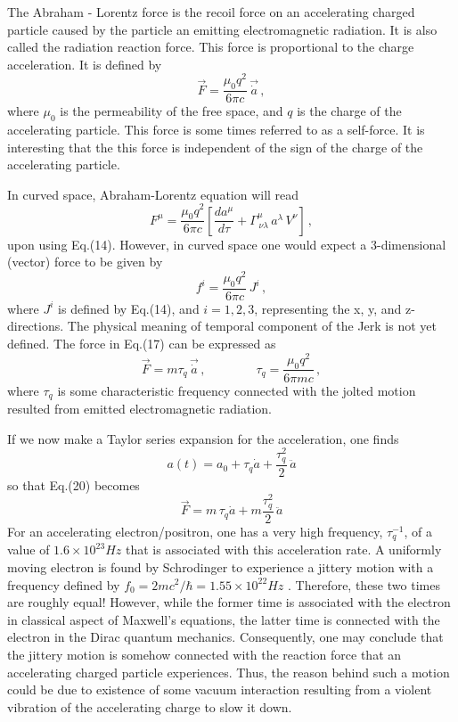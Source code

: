 \documentclass[12pt]{article}
\begin{document}
The Abraham - Lorentz force  is the recoil force on an accelerating charged particle caused by the particle an emitting electromagnetic radiation. It is also called the radiation reaction force. This force is proportional to the charge acceleration. It is defined by {\cite{abraham}}
\begin{equation}
\vec{F}=\frac{\mu_0 q^2}{6\pi c}\, \vec{\dot a}\,,
\end{equation}
where $\mu_0$ is the permeability of the free space, and $q$ is the charge of the accelerating particle. This force is some times referred to as a self-force. It is interesting that the this force is independent of the sign of the  charge of the accelerating particle.

In curved space, Abraham-Lorentz equation will read
\begin{equation}
F^\mu=\frac{\mu_0 q^2}{6\pi c}\left[\frac{da^\mu}{d\tau}+\Gamma ^\mu_{\,\nu\lambda}\, a^\lambda\,V^\nu\right]\,,
\end{equation}
upon using Eq.(14). However, in curved space one would expect a 3-dimensional (vector) force to be given by
\begin{equation}
f^i=\frac{\mu_0 q^2}{6\pi c}\, J^i\,,
\end{equation}
where $J^i$ is defined by Eq.(14), and $i=1, 2, 3$, representing the x, y, and z-directions. The physical meaning of temporal component of the Jerk is not yet defined. The  force in Eq.(17) can be expressed as
\begin{equation}
\vec{F}=m\tau_q\, \vec{\dot a}\,,\qquad\qquad \tau_q=\frac{\mu_0 q^2}{6\pi mc}\,,
\end{equation}
  where $\tau_q$ is some characteristic frequency connected with the jolted  motion resulted from emitted electromagnetic radiation.

If we now make a Taylor series expansion for the  acceleration, one finds
$$ a(t)=a_0+\tau_q\dot a+\frac{\tau_q^2}{2}\,\ddot a$$
so that Eq.(20) becomes
$$\vec{F}=m\,\tau_q\dot a+m\frac{\tau_q^2}{2}\,\ddot a $$
For an accelerating electron/positron, one has a very high frequency, $\tau_q^{-1} $, of a value of $1.6\times 10^{23}Hz$ that is associated with this acceleration rate.  A uniformly moving electron is found by Schrodinger to experience a jittery motion with a frequency defined by  $f_0=2mc^2/\hbar=1.55\times 10^{22}Hz$ {\cite{schrod}}. Therefore, these two times are roughly equal! However, while the former time is associated with the electron in classical aspect of Maxwell's equations, the latter time is connected with the electron in the  Dirac quantum mechanics. Consequently, one may conclude that the jittery motion is somehow connected with the reaction force that an accelerating charged  particle experiences. Thus, the reason behind such a motion could be due to existence of some vacuum interaction resulting from a violent vibration of the accelerating charge to slow it down.
\end{document}
